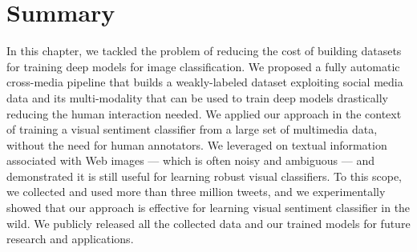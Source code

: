 
\section{Summary}
\label{sec:vsa:conclusion}

In this chapter, we tackled the problem of reducing the cost of building datasets for training deep models for image classification.
We proposed a fully automatic cross-media pipeline that builds a weakly-labeled dataset exploiting social media data and its multi-modality that can be used to train deep models drastically reducing the human interaction needed.
We applied our approach in the context of training a visual sentiment classifier from a large set of multimedia data, without the need for human annotators.
We leveraged on textual information associated with Web images --- which is often noisy and ambiguous --- and demonstrated it is still useful for learning robust visual classifiers.
To this scope, we collected and used more than three million tweets, and we experimentally showed that our approach is effective for learning visual sentiment classifier in the wild.
We publicly released all the collected data and our trained models for future research and applications.